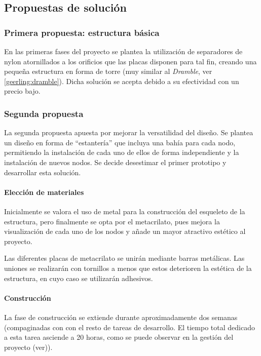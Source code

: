 \subsection{Propuestas de solución}

\subsubsection{Primera propuesta: estructura básica}

En las primeras fases del proyecto se plantea la utilización de separadores de nylon atornillados a los orificios que las placas disponen para tal fin, creando una pequeña estructura en forma de torre (muy similar al \textit{Dramble}, ver \ref{geerling:dramble}). Dicha solución se acepta debido a su efectividad con un precio bajo.

\subsubsection{Segunda propuesta}

La segunda propuesta apuesta por mejorar la versatilidad del diseño. Se plantea un diseño en forma de ``estantería'' que incluya una bahía para cada nodo, permitiendo la instalación de cada uno de ellos de forma independiente y la instalación de nuevos nodos. Se decide desestimar el primer prototipo y desarrollar esta solución.

\paragraph{Elección de materiales\\}

Inicialmente se valora el uso de metal para la construcción del esqueleto de la estructura, pero finalmente se opta por el metacrilato, pues mejora la visualización de cada uno de los nodos y añade un mayor atractivo estético al proyecto.

Las diferentes placas de metacrilato se unirán mediante barras metálicas. Las uniones se realizarán con tornillos a menos que estos deterioren la estética de la estructura, en cuyo caso se utilizarán adhesivos.

\paragraph{Construcción\\}

La fase de construcción se extiende durante aproximadamente dos semanas (compaginadas con con el resto de tareas de desarrollo. El tiempo total dedicado a esta tarea asciende a 20 horas, como se puede observar en la gestión del proyecto (ver\citationneeded[TODO])).

